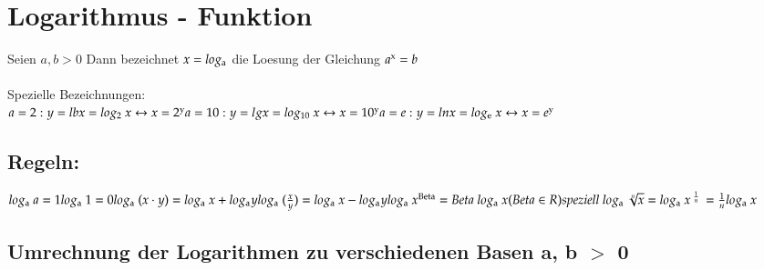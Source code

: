 \documentclass{article}
\begin{document}
\section{Logarithmus - Funktion}
 

Seien $a,b > 0$ Dann bezeichnet $x = log\textsubscript{a}$ die Loesung der Gleichung $a\textsuperscript{x} = b$
\\
\\Spezielle Bezeichnungen:
\\$a = 2 : y = lb x = log\textsubscript{2}\ x \leftrightarrow x = 2\textsuperscript{y} 
\\a = 10 : y = lg x = log\textsubscript{10}\ x \leftrightarrow x = 10\textsuperscript{y}
\\a = e : y = ln x = log\textsubscript{e}\ x \leftrightarrow x = e\textsuperscript{y}
$

\subsection{Regeln:}


$log\textsubscript{a}\ a = 1\\
\\log\textsubscript{a}\ 1 = 0\\
\\log\textsubscript{a}\ (x \cdot y) = log\textsubscript{a}\ x + log\textsubscript{a} y\\
\\log\textsubscript{a}\ (\frac{x}{y}) = log\textsubscript{a}\ x - log\textsubscript{a} y\\
\\log\textsubscript{a}\ x\textsuperscript{Beta} = Beta\ log\textsubscript{a}\ x (Beta \in R)\\
\\speziell\ log\textsubscript{a}\ \sqrt[n]{x} = log\textsubscript{a}\ x\textsuperscript{ $\frac{1}{n}$ } = \frac{1}{n} log\textsubscript{a}\ x\\
$

\subsection{Umrechnung der Logarithmen zu verschiedenen Basen a, b $>$ 0}
\end{document}
